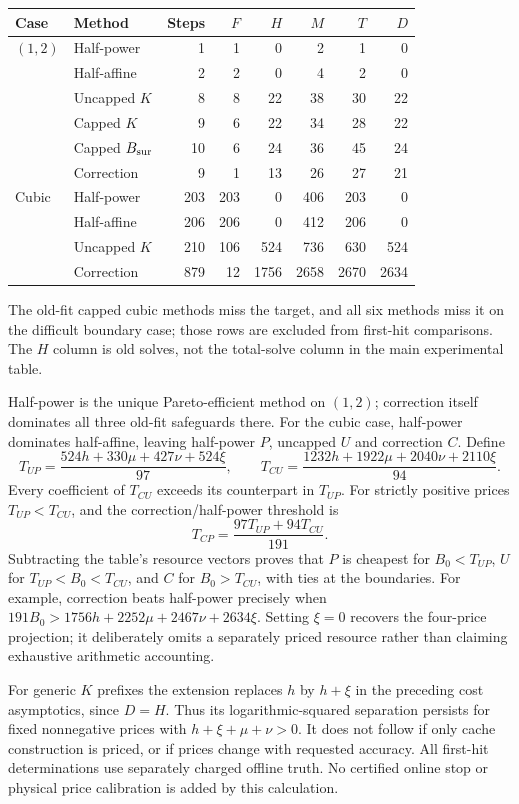 \begin{center}\small
\begin{tabular}{llrrrrrr}
\toprule
Case & Method & Steps & $F$ & $H$ & $M$ & $T$ & $D$\\
\midrule
$(1,2)$ & Half-power &1&1&0&2&1&0\\
 & Half-affine &2&2&0&4&2&0\\
 & Uncapped $K$ &8&8&22&38&30&22\\
 & Capped $K$ &9&6&22&34&28&22\\
 & Capped $B_{\rm sur}$ &10&6&24&36&45&24\\
 & Correction &9&1&13&26&27&21\\
\midrule
Cubic & Half-power &203&203&0&406&203&0\\
 & Half-affine &206&206&0&412&206&0\\
 & Uncapped $K$ &210&106&524&736&630&524\\
 & Correction &879&12&1756&2658&2670&2634\\
\bottomrule
\end{tabular}
\end{center}
The old-fit capped cubic methods miss the target, and all six methods miss it on the difficult boundary case; those rows are excluded from first-hit comparisons. The $H$ column is old solves, not the total-solve column in the main experimental table.

Half-power is the unique Pareto-efficient method on $(1,2)$; correction itself dominates all three old-fit safeguards there. For the cubic case, half-power dominates half-affine, leaving half-power $P$, uncapped $U$ and correction $C$. Define
\[
 T_{UP}=\frac{524h+330\mu+427\nu+524\xi}{97},\qquad
 T_{CU}=\frac{1232h+1922\mu+2040\nu+2110\xi}{94}.
\]
Every coefficient of $T_{CU}$ exceeds its counterpart in $T_{UP}$. For strictly positive prices $T_{UP}<T_{CU}$, and the correction/half-power threshold is
\[
 T_{CP}=\frac{97T_{UP}+94T_{CU}}{191}.
\]
Subtracting the table's resource vectors proves that $P$ is cheapest for $B_0<T_{UP}$, $U$ for $T_{UP}<B_0<T_{CU}$, and $C$ for $B_0>T_{CU}$, with ties at the boundaries. For example, correction beats half-power precisely when
$191B_0>1756h+2252\mu+2467\nu+2634\xi$.
Setting $\xi=0$ recovers the four-price projection; it deliberately omits a separately priced resource rather than claiming exhaustive arithmetic accounting.

For generic $K$ prefixes the extension replaces $h$ by $h+\xi$ in the preceding cost asymptotics, since $D=H$. Thus its logarithmic-squared separation persists for fixed nonnegative prices with $h+\xi+\mu+\nu>0$. It does not follow if only cache construction is priced, or if prices change with requested accuracy.
All first-hit determinations use separately charged offline truth. No certified online stop or physical price calibration is added by this calculation.

